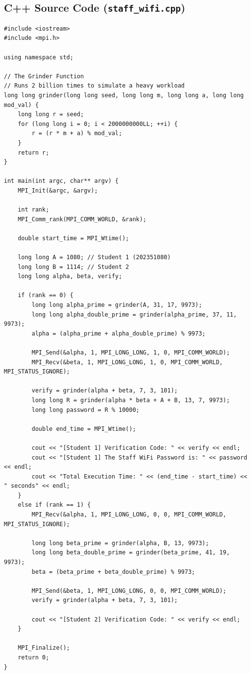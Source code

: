 \documentclass[11pt]{article}
\begin{document}
\subsection{C++ Source Code (\texttt{staff\_wifi.cpp})}
\begin{codebox}
\begin{lstlisting}
#include <iostream>
#include <mpi.h>

using namespace std;

// The Grinder Function
// Runs 2 billion times to simulate a heavy workload
long long grinder(long long seed, long long m, long long a, long long mod_val) {
    long long r = seed;
    for (long long i = 0; i < 2000000000LL; ++i) {
        r = (r * m + a) % mod_val;
    }
    return r;
}

int main(int argc, char** argv) {
    MPI_Init(&argc, &argv);

    int rank;
    MPI_Comm_rank(MPI_COMM_WORLD, &rank);

    double start_time = MPI_Wtime();

    long long A = 1080; // Student 1 (202351080)
    long long B = 1114; // Student 2 
    long long alpha, beta, verify;

    if (rank == 0) {
        long long alpha_prime = grinder(A, 31, 17, 9973);
        long long alpha_double_prime = grinder(alpha_prime, 37, 11, 9973);
        alpha = (alpha_prime + alpha_double_prime) % 9973;

        MPI_Send(&alpha, 1, MPI_LONG_LONG, 1, 0, MPI_COMM_WORLD);
        MPI_Recv(&beta, 1, MPI_LONG_LONG, 1, 0, MPI_COMM_WORLD, MPI_STATUS_IGNORE);

        verify = grinder(alpha + beta, 7, 3, 101);
        long long R = grinder(alpha * beta + A + B, 13, 7, 9973);
        long long password = R % 10000;

        double end_time = MPI_Wtime();

        cout << "[Student 1] Verification Code: " << verify << endl;
        cout << "[Student 1] The Staff WiFi Password is: " << password << endl;
        cout << "Total Execution Time: " << (end_time - start_time) << " seconds" << endl;
    } 
    else if (rank == 1) {
        MPI_Recv(&alpha, 1, MPI_LONG_LONG, 0, 0, MPI_COMM_WORLD, MPI_STATUS_IGNORE);

        long long beta_prime = grinder(alpha, B, 13, 9973);
        long long beta_double_prime = grinder(beta_prime, 41, 19, 9973);
        beta = (beta_prime + beta_double_prime) % 9973;

        MPI_Send(&beta, 1, MPI_LONG_LONG, 0, 0, MPI_COMM_WORLD);
        verify = grinder(alpha + beta, 7, 3, 101);

        cout << "[Student 2] Verification Code: " << verify << endl;
    }

    MPI_Finalize();
    return 0;
}
\end{lstlisting}
\end{codebox}
\end{document}
